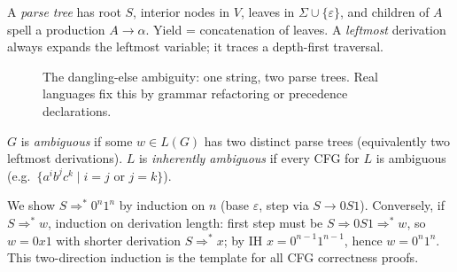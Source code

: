 \begin{definition}
A \emph{parse tree} has root $S$, interior nodes in $V$, leaves in $\Sigma\cup\{\varepsilon\}$, and children of $A$ spell a production $A\to\alpha$. Yield = concatenation of leaves. A \emph{leftmost} derivation always expands the leftmost variable; it traces a depth-first traversal.
\end{definition}

\begin{figure}[h]
\centering
{}
\caption{The dangling-else ambiguity: one string, two parse trees. Real languages fix this by grammar refactoring or precedence declarations.}
\label{fig:ambiguity-ifelse}
\end{figure}

\begin{definition}[Ambiguity]
$G$ is \emph{ambiguous} if some $w\in L(G)$ has two distinct parse trees (equivalently two leftmost derivations). $L$ is \emph{inherently ambiguous} if every CFG for $L$ is ambiguous (e.g.\ $\{a^ib^jc^k\mid i=j\text{ or }j=k\}$).
\end{definition}

\begin{example}[Proving $L(G)=\{0^n1^n\}$ by induction]
We show $S\Rightarrow^*0^n1^n$ by induction on $n$ (base $\varepsilon$, step via $S\to0S1$). Conversely, if $S\Rightarrow^*w$, induction on derivation length: first step must be $S\Rightarrow0S1\Rightarrow^*w$, so $w=0x1$ with shorter derivation $S\Rightarrow^*x$; by IH $x=0^{n-1}1^{n-1}$, hence $w=0^n1^n$. This two-direction induction is the template for all CFG correctness proofs.
\end{example}

